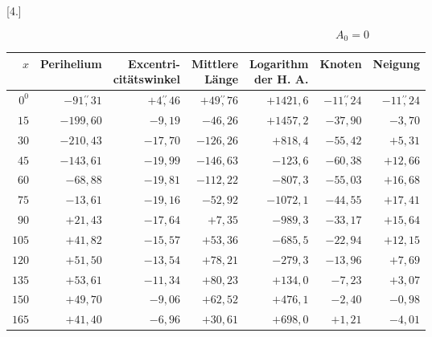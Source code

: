 \clearpage
\begingroup
{}
\renewcommand{\headrulewidth}{0pt}
\par\medskip
{}
\begin{center}[4.]\end{center}
\[
A_0=0
\]
\begingroup\small
\setlength{\tabcolsep}{3pt}
\renewcommand{\arraystretch}{1.12}
\begin{center}
\begin{tabular}{r|r|r|r|r|r|r}
\hline
\(x\) & Perihelium & \shortstack{Excentri-\\citätswinkel} & \shortstack{Mittlere\\Länge} & \shortstack{Logarithm\\der H. A.} & Knoten & Neigung \\
\hline
\(0^0\) & \(-91\overset{\prime\prime}{,}31\) & \(+4\overset{\prime\prime}{,}46\) & \(+49\overset{\prime\prime}{,}76\) & \(+1421{,}6\) & \(-11\overset{\prime\prime}{,}24\) & \(-11\overset{\prime\prime}{,}24\) \\
\(15\) & \(-199{,}60\) & \(-9{,}19\) & \(-46{,}26\) & \(+1457{,}2\) & \(-37{,}90\) & \(-3{,}70\) \\
\(30\) & \(-210{,}43\) & \(-17{,}70\) & \(-126{,}26\) & \(+818{,}4\) & \(-55{,}42\) & \(+5{,}31\) \\
\(45\) & \(-143{,}61\) & \(-19{,}99\) & \(-146{,}63\) & \(-123{,}6\) & \(-60{,}38\) & \(+12{,}66\) \\[3pt]
\(60\) & \(-68{,}88\) & \(-19{,}81\) & \(-112{,}22\) & \(-807{,}3\) & \(-55{,}03\) & \(+16{,}68\) \\
\(75\) & \(-13{,}61\) & \(-19{,}16\) & \(-52{,}92\) & \(-1072{,}1\) & \(-44{,}55\) & \(+17{,}41\) \\
\(90\) & \(+21{,}43\) & \(-17{,}64\) & \(+7{,}35\) & \(-989{,}3\) & \(-33{,}17\) & \(+15{,}64\) \\
\(105\) & \(+41{,}82\) & \(-15{,}57\) & \(+53{,}36\) & \(-685{,}5\) & \(-22{,}94\) & \(+12{,}15\) \\[3pt]
\(120\) & \(+51{,}50\) & \(-13{,}54\) & \(+78{,}21\) & \(-279{,}3\) & \(-13{,}96\) & \(+7{,}69\) \\
\(135\) & \(+53{,}61\) & \(-11{,}34\) & \(+80{,}23\) & \(+134{,}0\) & \(-7{,}23\) & \(+3{,}07\) \\
\(150\) & \(+49{,}70\) & \(-9{,}06\) & \(+62{,}52\) & \(+476{,}1\) & \(-2{,}40\) & \(-0{,}98\) \\
\(165\) & \(+41{,}40\) & \(-6{,}96\) & \(+30{,}61\) & \(+698{,}0\) & \(+1{,}21\) & \(-4{,}01\) \\[3pt]

\end{tabular}
\end{center}

